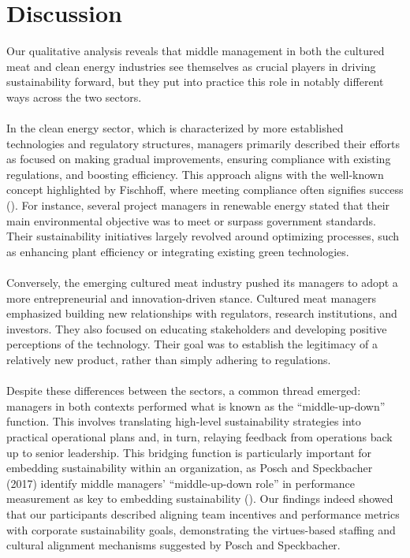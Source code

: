 
	
	\section{Discussion}
	
	Our qualitative analysis reveals that middle management in both the cultured meat and clean energy industries see themselves as crucial players in driving sustainability forward, but they put into practice this role in notably different ways across the two sectors.
	
	\paragraph*{} In the clean energy sector, which is characterized by more established technologies and regulatory structures, managers primarily described their efforts as focused on making gradual improvements, ensuring compliance with existing regulations, and boosting efficiency. This approach aligns with the well-known concept highlighted by Fischhoff, where meeting compliance often signifies success (\textcite{Fischhoff2024}). For instance, several project managers in renewable energy stated that their main environmental objective was to meet or surpass government standards. Their sustainability initiatives largely revolved around optimizing processes, such as enhancing plant efficiency or integrating existing green technologies.
	
	\paragraph*{} Conversely, the emerging cultured meat industry pushed its managers to adopt a more entrepreneurial and innovation-driven stance. Cultured meat managers emphasized building new relationships with regulators, research institutions, and investors. They also focused on educating stakeholders and developing positive perceptions of the technology. Their goal was to establish the legitimacy of a relatively new product, rather than simply adhering to regulations.
	
	\paragraph*{} Despite these differences between the sectors, a common thread emerged: managers in both contexts performed what is known as the ``middle-up-down'' function. This involves translating high-level sustainability strategies into practical operational plans and, in turn, relaying feedback from operations back up to senior leadership. This bridging function is particularly important for embedding sustainability within an organization, as Posch and Speckbacher (2017) identify middle managers’ ``middle-up-down role'' in performance measurement as key to embedding sustainability (\textcite{Posch2017}). Our findings indeed showed that our participants described aligning team incentives and performance metrics with corporate sustainability goals, demonstrating the virtues-based staffing and cultural alignment mechanisms suggested by Posch and Speckbacher.
	
